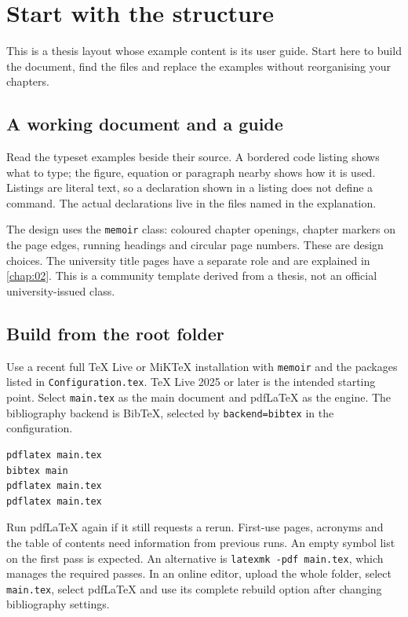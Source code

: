 
\chapter{Start with the structure}\label{chap:01}
\renewcommand{\FigLocation}{Chapters/Chapter_1/fig/}
\renewcommand{\ChapLocation}{Chapters/Chapter_1/}
\begin{absbox}
This is a thesis layout whose example content is its user guide. Start here to build the document, find the files and replace the examples without reorganising your chapters.
\end{absbox}

\section{A working document and a guide}
Read the typeset examples beside their source. A bordered code listing shows
what to type; the figure, equation or paragraph nearby shows how it is used.
Listings are literal text, so a declaration shown in a listing does not define
a command. The actual declarations live in the files named in the explanation.

The design uses the \texttt{memoir} class: coloured chapter openings, chapter
markers on the page edges, running headings and circular page numbers. These
are design choices. The university title pages have a separate role and are
explained in \autoref{chap:02}. This is a community template derived from a thesis,
not an official university-issued class.

\section{Build from the root folder}
Use a recent full TeX Live or MiKTeX installation with \texttt{memoir} and the
packages listed in \texttt{Configuration.tex}. TeX Live 2025 or later is the
intended starting point. Select \texttt{main.tex} as the main document and
pdfLaTeX as the engine. The bibliography backend is BibTeX, selected by
\texttt{backend=bibtex} in the configuration.
\begin{lstlisting}[language={}]
pdflatex main.tex
bibtex main
pdflatex main.tex
pdflatex main.tex
\end{lstlisting}
Run pdfLaTeX again if it still requests a rerun. First-use pages, acronyms and
the table of contents need information from previous runs. An empty symbol list
on the first pass is expected. An alternative is \texttt{latexmk -pdf main.tex},
which manages the required passes. In an online editor, upload the whole folder,
select \texttt{main.tex}, select pdfLaTeX and use its complete rebuild option
after changing bibliography settings.

